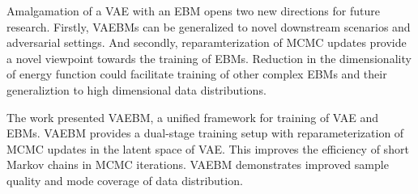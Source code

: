 \documentclass[12pt,letterpaper]{article}
\begin{document}
Amalgamation of a VAE with an EBM opens two new directions for future research. Firstly, VAEBMs can be generalized to novel downstream scenarios and adversarial settings. And secondly, reparamterization of MCMC updates provide a novel viewpoint towards the training of EBMs. Reduction in the dimensionality of energy function could facilitate training of other complex EBMs and their generaliztion to high dimensional data distributions.

The work presented VAEBM, a unified framework for training of VAE and EBMs. VAEBM provides a dual-stage training setup with reparameterization of MCMC updates in the latent space of VAE. This improves the efficiency of short Markov chains in MCMC iterations. VAEBM demonstrates improved sample quality and mode coverage of data distribution.
\end{document}
